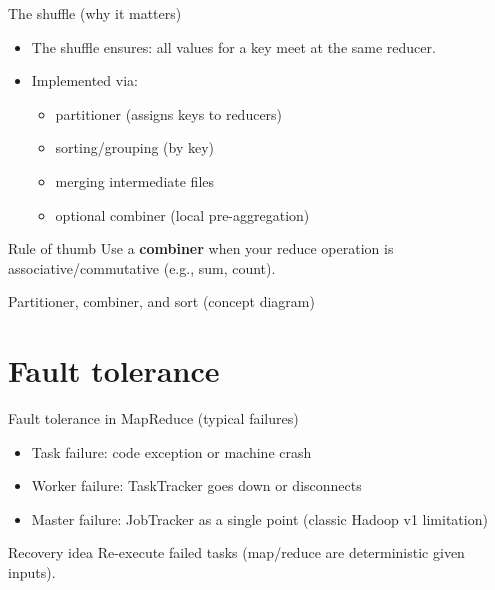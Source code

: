 \documentclass[10pt,aspectratio=169]{beamer}
\newenvironment{examplebox}[1][Example]{\begin{exampleblock}{#1}}{\end{exampleblock}}
\begin{document}
\begin{frame}{The shuffle (why it matters)}
\begin{itemize}
  \item The shuffle ensures: all values for a key meet at the same reducer.
  \item Implemented via:
  \begin{itemize}
    \item partitioner (assigns keys to reducers)
    \item sorting/grouping (by key)
    \item merging intermediate files
    \item optional combiner (local pre-aggregation)
  \end{itemize}
\end{itemize}

\begin{examplebox}[Rule of thumb]
Use a \textbf{combiner} when your reduce operation is associative/commutative (e.g., sum, count).
\end{examplebox}
\end{frame}

\begin{frame}{Partitioner, combiner, and sort (concept diagram)}
\centering
{}
\end{frame}

\section{Fault tolerance}

\begin{frame}{Fault tolerance in MapReduce (typical failures)}
\begin{itemize}
  \item Task failure: code exception or machine crash
  \item Worker failure: TaskTracker goes down or disconnects
  \item Master failure: JobTracker as a single point (classic Hadoop v1 limitation)
\end{itemize}
\begin{examplebox}[Recovery idea]
Re-execute failed tasks (map/reduce are deterministic given inputs).
\end{examplebox}
\end{frame}
\end{document}
